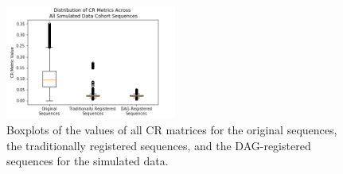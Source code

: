 \begin{figure}
\centering
\includegraphics[width=0.5\textwidth]{6/figures/spectr-cr-box.png}
\caption{Boxplots of the values of all CR matrices for the original sequences, the traditionally registered sequences, and the DAG-registered sequences for the simulated data.}
\label{fig:spectr-cr-box}
\end{figure}

